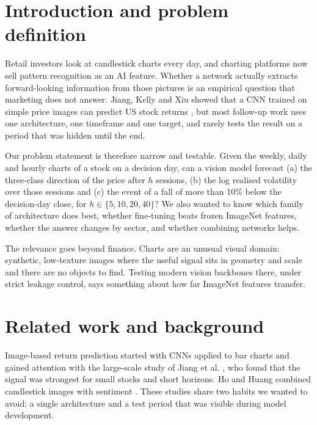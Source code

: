 \documentclass[11pt,a4paper]{article}
\begin{document}
\section{Introduction and problem definition}

Retail investors look at candlestick charts every day, and charting platforms now sell pattern recognition as an AI feature. Whether a network actually extracts forward-looking information from those pictures is an empirical question that marketing does not answer. Jiang, Kelly and Xiu showed that a CNN trained on simple price images can predict US stock returns \cite{jkx2023}, but most follow-up work uses one architecture, one timeframe and one target, and rarely tests the result on a period that was hidden until the end.

Our problem statement is therefore narrow and testable. Given the weekly, daily and hourly charts of a stock on a decision day, can a vision model forecast (a) the three-class direction of the price after $h$ sessions, (b) the log realised volatility over those sessions and (c) the event of a fall of more than 10\% below the decision-day close, for $h \in \{5,10,20,40\}$? We also wanted to know which family of architecture does best, whether fine-tuning beats frozen ImageNet features, whether the answer changes by sector, and whether combining networks helps.

The relevance goes beyond finance. Charts are an unusual visual domain: synthetic, low-texture images where the useful signal sits in geometry and scale and there are no objects to find. Testing modern vision backbones there, under strict leakage control, says something about how far ImageNet features transfer.

\section{Related work and background}

Image-based return prediction started with CNNs applied to bar charts \cite{sezer2019} and gained attention with the large-scale study of Jiang et al. \cite{jkx2023}, who found that the signal was strongest for small stocks and short horizons. Ho and Huang combined candlestick images with sentiment \cite{ho2021}. These studies share two habits we wanted to avoid: a single architecture and a test period that was visible during model development.
\end{document}
